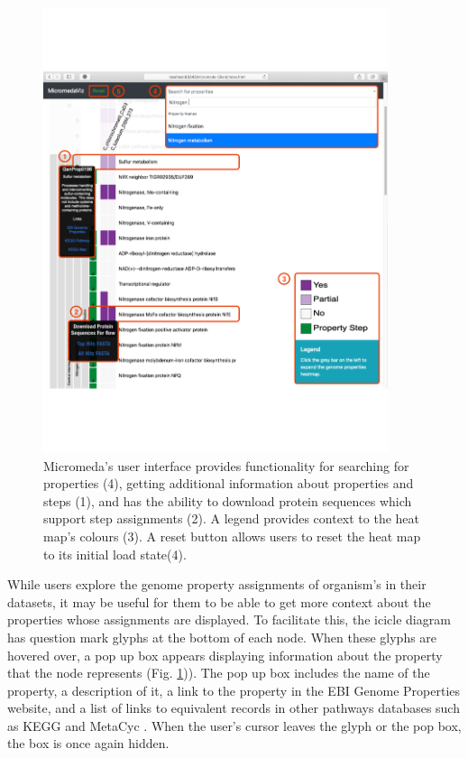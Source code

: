 \begin{figure}[!ht]
  \centering
	\includegraphics[width=0.9\textwidth]{media/micromeda-interface.pdf}
	 \caption{Micromeda's user interface provides functionality for searching for properties (4), getting additional information about properties and steps (1), and has the ability to download protein sequences which support step assignments (2). A legend provides context to the heat map's colours (3). A reset button allows users to reset the heat map to its initial load state(4).}
	 \label{fig:micromeda-interface}
\end{figure}

While users explore the genome property assignments of organism's in their datasets, it may be useful for them to be able to get more context about the properties whose assignments are displayed. To facilitate this, the icicle diagram has question mark glyphs at the bottom of each node. When these glyphs are hovered over, a pop up box appears displaying information about the property that the node represents (Fig. \ref{fig:micromeda-interface})). The pop up box includes the name of the property, a description of it, a link to the property in the EBI Genome Properties website, and a list of links to equivalent records in other pathways databases such as KEGG \cite{kanehisa2000kegg} and MetaCyc \cite{karp2002metacyc}. When the user's cursor leaves the glyph or the pop box, the box is once again hidden.

